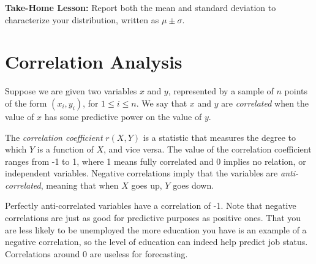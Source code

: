 \documentclass[10pt]{article}
\begin{document}
\textbf{Take-Home Lesson:} Report both the mean and standard deviation to characterize your distribution, written as \(\mu \pm \sigma\).

\section{Correlation Analysis}
Suppose we are given two variables \(x\) and \(y\), represented by a sample of \(n\) points of the form \((x_{i}, y_{i})\), for \(1 \leq i \leq n\). We say that \(x\) and \(y\) are \textit{correlated} when the value of \(x\) has some predictive power on the value of \(y\).

The \textit{correlation coefficient} \(r(X, Y)\) is a statistic that measures the degree to which \(Y\) is a function of \(X\), and vice versa. The value of the correlation coefficient ranges from -1 to 1, where 1 means fully correlated and 0 implies no relation, or independent variables. Negative correlations imply that the variables are \textit{anti-correlated}, meaning that when \(X\) goes up, \(Y\) goes down.

Perfectly anti-correlated variables have a correlation of -1. Note that negative correlations are just as good for predictive purposes as positive ones. That you are less likely to be unemployed the more education you have is an example of a negative correlation, so the level of education can indeed help predict job status. Correlations around 0 are useless for forecasting.
\end{document}
